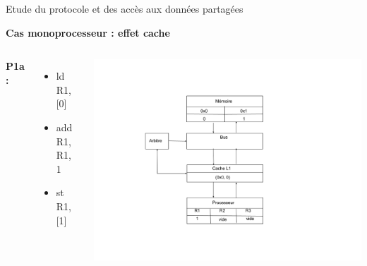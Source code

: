 \documentclass{beamer}
\begin{document}
\begin{frame}{Etude du protocole et des accès aux données partagées}
    \addtocounter{framenumber}{-1}
    \textbf{Cas monoprocesseur : effet cache}
    \begin{columns}[c] %

        \textbf{P1a : }
        \begin{itemize}
            \item ld R1, [0]
            \item add R1, R1, 1
            \item  st R1, [1]
        \end{itemize}

        \includegraphics[scale=0.28]{f3.png}
        
    \end{columns}
\end{frame}
\end{document}
